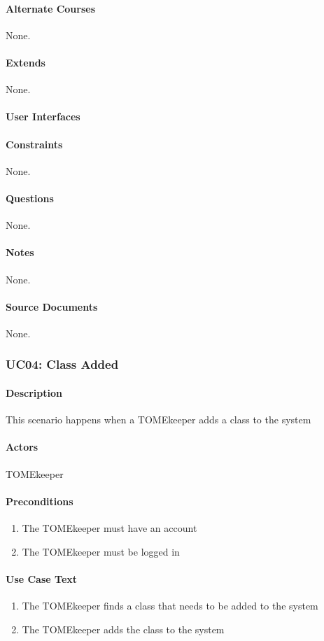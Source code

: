 \documentclass[12pt,titlepage]{article}
\begin{document}
\paragraph{Alternate Courses}
None.
\paragraph{Extends}
None.
\paragraph{User Interfaces}
\paragraph{Constraints}
None.
\paragraph{Questions}
None.
\paragraph{Notes}
None.
\paragraph{Source Documents}
None.

\subsubsection{UC04: Class Added}
\paragraph{Description}
This scenario happens when a TOMEkeeper adds a class to the system
\paragraph{Actors}
TOMEkeeper
\paragraph{Preconditions}
\begin{enumerate}
	\item The TOMEkeeper must have an account
	\item The TOMEkeeper must be logged in
\end{enumerate}
\paragraph{Use Case Text}
\begin{enumerate}
	\item The TOMEkeeper finds a class that needs to be added to the system
	\item The TOMEkeeper adds the class to the system
\end{enumerate}
\end{document}
